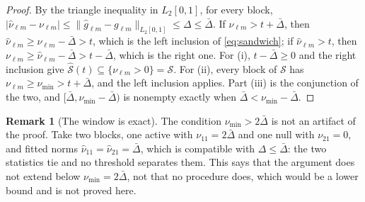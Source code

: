 \documentclass[10pt]{book}
\theoremstyle{definition}
\newtheorem{remark}{Remark}[section]
\newcommand{\cv}{\ell}
\newcommand{\md}{m}
\newcommand{\gcomp}[2]{g_{#1#2}}
\begin{document}
{\begin{proof}
By the triangle inequality in $L_2[0,1]$, for every block,
$|\widehat{\nu}_{\cv\md} - \nu_{\cv\md}| \le
\lVert\widehat{g}_{\cv\md} - \gcomp{\cv}{\md}\rVert_{L_2[0,1]} \le \Delta \le \bar{\Delta}$.
If $\nu_{\cv\md} > t + \bar{\Delta}$, then
$\widehat{\nu}_{\cv\md} \ge \nu_{\cv\md} - \bar{\Delta} > t$, which is the left inclusion of
\eqref{eq:sandwich}; if $\widehat{\nu}_{\cv\md} > t$, then
$\nu_{\cv\md} \ge \widehat{\nu}_{\cv\md} - \bar{\Delta} > t - \bar{\Delta}$, which is the right one. For
(i), $t - \bar{\Delta} \ge 0$ and the right inclusion give $\widehat{\mathcal{S}}(t) \subseteq
\{\nu_{\cv\md} > 0\} = \mathcal{S}$. For (ii), every block of $\mathcal{S}$ has
$\nu_{\cv\md} \ge \nu_{\min} > t + \bar{\Delta}$, and the left inclusion applies. Part (iii) is
the conjunction of the two, and $[\bar{\Delta}, \nu_{\min} - \bar{\Delta})$ is nonempty exactly when
$\bar{\Delta} < \nu_{\min} - \bar{\Delta}$.
\end{proof}

\begin{remark}[The window is exact]
\label{rem:window}
The condition $\nu_{\min} > 2\bar{\Delta}$ is not an artifact of the proof. Take two blocks,
one active with $\nu_{11} = 2\bar{\Delta}$ and one null with $\nu_{21} = 0$, and fitted
norms $\widehat{\nu}_{11} = \widehat{\nu}_{21} = \bar{\Delta}$, which is compatible with
$\Delta \le \bar{\Delta}$: the two statistics tie and no threshold separates them. This
says that the argument does not extend below $\nu_{\min} = 2\bar{\Delta}$, not that no
procedure does, which would be a lower bound and is not proved here.
\end{remark}

}
\end{document}
